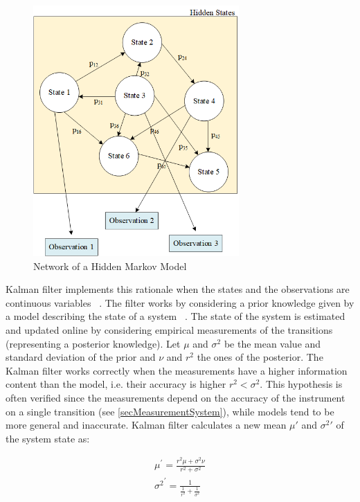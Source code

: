 \begin{figure}[hbt!]
\centering
\includegraphics[width=0.7\textwidth]{SectionLetsMath/nonLinearMethods_fig/fig_hiddenMarkovModel.png}
\captionsetup{type=figure}
\caption{Network of a Hidden Markov Model}
\label{fig_hiddenMarkovModel}
\end{figure}

Kalman filter implements this rationale when the states and the observations are continuous variables ~\cite{Anandalingam1989}. The filter works by considering a prior knowledge given by a model describing the state of a system ~\cite{LAARAIEDH, Fang2018}. The state of the system is estimated and updated online by considering empirical measurements of the transitions (representing a posterior knowledge). Let $\mu$ and $\sigma^2$ be the mean value and standard deviation of the prior and $\nu$ and $r^2$ the ones of the posterior. The Kalman filter works correctly when the measurements have a higher information content than the model, i.e. their accuracy is higher $r^2<\sigma^2$. This hypothesis is often verified since the measurements depend on the accuracy of the instrument on a single transition (see \ref{secMeasurementSystem}), while models tend to be more general and inaccurate. Kalman filter calculates a new mean $\mu\prime$ and $\sigma^2\prime$ of the system state as:

\begin{equation}
\begin{split}
        \mu^\prime=\frac{r^2\mu+\sigma^2\nu}{r^2+\sigma^2}\\
        {\sigma^2}^\prime=\frac{1}{\frac{1}{r^2}+\frac{1}{\sigma^2}}\\
\end{split}
\label{eq_kalmanFilter1}
\end{equation}

